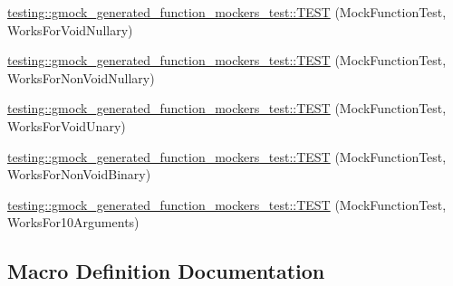 \begin{DoxyCompactItemize}
\item 
\hyperlink{namespacetesting_1_1gmock__generated__function__mockers__test_a8d67aadbc04fee7e2afc10ee91a76b74}{testing\+::gmock\+\_\+generated\+\_\+function\+\_\+mockers\+\_\+test\+::\+T\+E\+ST} (Mock\+Function\+Test, Works\+For\+Void\+Nullary)
\item 
\hyperlink{namespacetesting_1_1gmock__generated__function__mockers__test_a90817999d7f25ecf280453efb157db84}{testing\+::gmock\+\_\+generated\+\_\+function\+\_\+mockers\+\_\+test\+::\+T\+E\+ST} (Mock\+Function\+Test, Works\+For\+Non\+Void\+Nullary)
\item 
\hyperlink{namespacetesting_1_1gmock__generated__function__mockers__test_ab0e1ede6a1f6ef1774e27f5793a33599}{testing\+::gmock\+\_\+generated\+\_\+function\+\_\+mockers\+\_\+test\+::\+T\+E\+ST} (Mock\+Function\+Test, Works\+For\+Void\+Unary)
\item 
\hyperlink{namespacetesting_1_1gmock__generated__function__mockers__test_ab6337da98bc6bc97100ab177386f3b2b}{testing\+::gmock\+\_\+generated\+\_\+function\+\_\+mockers\+\_\+test\+::\+T\+E\+ST} (Mock\+Function\+Test, Works\+For\+Non\+Void\+Binary)
\item 
\hyperlink{namespacetesting_1_1gmock__generated__function__mockers__test_aa92f0b2b98d76f2c881103a19bed7ba6}{testing\+::gmock\+\_\+generated\+\_\+function\+\_\+mockers\+\_\+test\+::\+T\+E\+ST} (Mock\+Function\+Test, Works\+For10\+Arguments)
\end{DoxyCompactItemize}


\subsection{Macro Definition Documentation}
